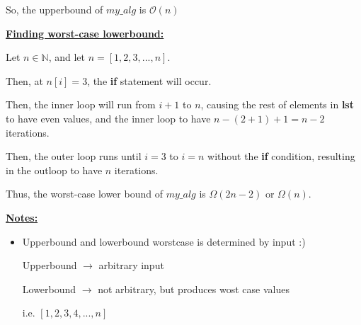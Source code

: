 \documentclass[12pt]{article}
\begin{document}
\begin{enumerate}[1.]
\begin{enumerate}[a)]
        \bigskip

        So, the upperbound of $my\_alg$ is $\mathcal{O}(n)$

        \bigskip

        \underline{\textbf{Finding worst-case lowerbound:}}

        \bigskip

        Let $n \in \mathbb{N}$, and let $n = [1,2,3,...,n]$.

        \bigskip

        Then, at $n[i] = 3$, the \textbf{if} statement will occur.

        \bigskip

        Then, the inner loop will run from $i + 1$ to $n$, causing the rest of elements
        in \textbf{lst} to have even values, and the inner loop to have $n - (2+1) + 1 = n - 2$ iterations.

        \bigskip

        Then, the outer loop runs until $i = 3$ to $i = n$ without the \textbf{if} condition,
        resulting in the outloop to have $n$ iterations.

        \bigskip
        Thus, the worst-case lower bound of \textbf{$my\_alg$} is $\Omega(2n - 2)$ or $\Omega(n)$.

        \bigskip

        \underline{\textbf{Notes:}}

        \bigskip

        \begin{itemize}
            \item Upperbound and lowerbound worstcase is determined by input :)

            \bigskip

            Upperbound $\to$ arbitrary input

            \bigskip

            Lowerbound $\to$ not arbitrary, but produces wost case values

            \bigskip

            i.e. $[1,2,3,4,...,n]$
        \end{itemize}

    \end{enumerate}

    \bigskip

\end{enumerate}
\end{document}
